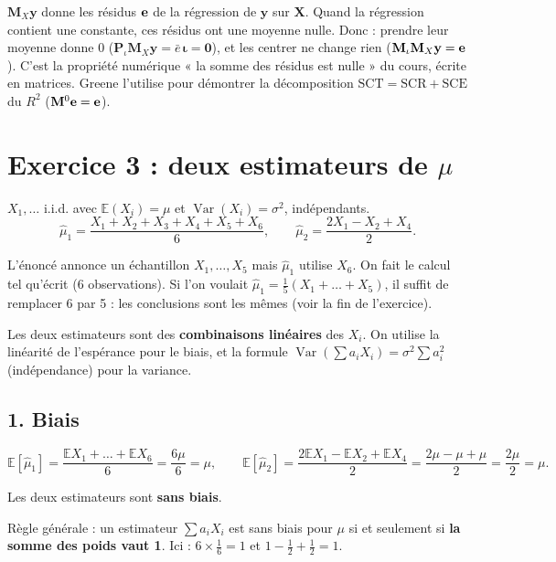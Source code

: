 \documentclass[11pt,a4paper]{article}
\newcommand{\vi}{\bm{\iota}}
\newcommand{\vy}{\mathbf{y}}\newcommand{\vY}{\mathbf{Y}}\newcommand{\vX}{\mathbf{X}}
\newcommand{\Pm}{\mathbf{P}}\newcommand{\Mm}{\mathbf{M}}
\newcommand{\E}{\mathbb{E}}\newcommand{\Var}{\operatorname{Var}}\newcommand{\Cov}{\operatorname{Cov}}
\begin{document}
\begin{intuition}
$\Mm_X\vy$ donne les résidus $\mathbf{e}$ de la régression de $\vy$ sur $\vX$. Quand la régression contient une constante, ces résidus ont une moyenne nulle. Donc : prendre leur moyenne donne 0 ($\Pm_\iota\Mm_X\vy=\bar e\,\vi=\mathbf 0$), et les centrer ne change rien ($\Mm_\iota\Mm_X\vy=\ve$). C'est la propriété numérique « la somme des résidus est nulle » du cours, écrite en matrices. Greene l'utilise pour démontrer la décomposition $\text{SCT}=\text{SCR}+\text{SCE}$ du $R^2$ ($\Mm^0\ve=\ve$).
\end{intuition}

\section{Exercice 3 : deux estimateurs de $\mu$}

$X_1,\dots$ i.i.d. avec $\E(X_i)=\mu$ et $\Var(X_i)=\sigma^2$, indépendants.
\[
\hat\mu_1=\frac{X_1+X_2+X_3+X_4+X_5+X_6}{6},\qquad \hat\mu_2=\frac{2X_1-X_2+X_4}{2}.
\]

\begin{attention}
L'énoncé annonce un échantillon $X_1,\dots,X_5$ mais $\hat\mu_1$ utilise $X_6$. On fait le calcul tel qu'écrit (6 observations). Si l'on voulait $\hat\mu_1=\frac15(X_1+\dots+X_5)$, il suffit de remplacer 6 par 5 : les conclusions sont les mêmes (voir la fin de l'exercice).
\end{attention}

\begin{idee}
Les deux estimateurs sont des \textbf{combinaisons linéaires} des $X_i$. On utilise la linéarité de l'espérance pour le biais, et la formule $\Var(\sum a_iX_i)=\sigma^2\sum a_i^2$ (indépendance) pour la variance.
\end{idee}

\subsection*{1. Biais}
\[
\E[\hat\mu_1]=\frac{\E X_1+\dots+\E X_6}{6}=\frac{6\mu}{6}=\mu,
\qquad
\E[\hat\mu_2]=\frac{2\E X_1-\E X_2+\E X_4}{2}=\frac{2\mu-\mu+\mu}{2}=\frac{2\mu}{2}=\mu .
\]

\begin{reponse}
Les deux estimateurs sont \textbf{sans biais}.

Règle générale : un estimateur $\sum a_iX_i$ est sans biais pour $\mu$ si et seulement si \textbf{la somme des poids vaut 1}. Ici : $6\times\frac16=1$ et $1-\frac12+\frac12=1$.
\end{reponse}
\end{document}
